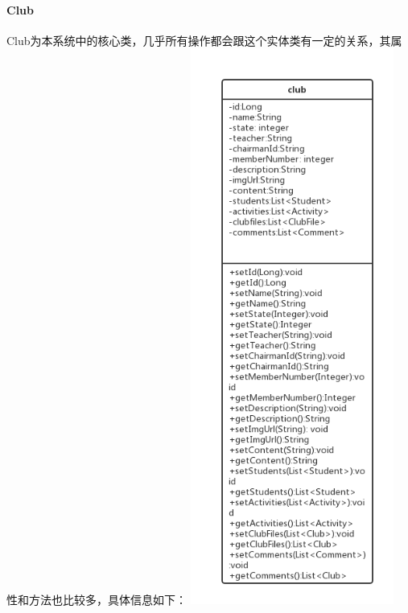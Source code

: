 \documentclass[UTF8]{ctexart}
\begin{document}
\paragraph{Club}
Club为本系统中的核心类，几乎所有操作都会跟这个实体类有一定的关系，其属性和方法也比较多，具体信息如下：
\newline
\includegraphics[width = 0.5\textwidth]{club-class.png}
\newline
\end{document}
